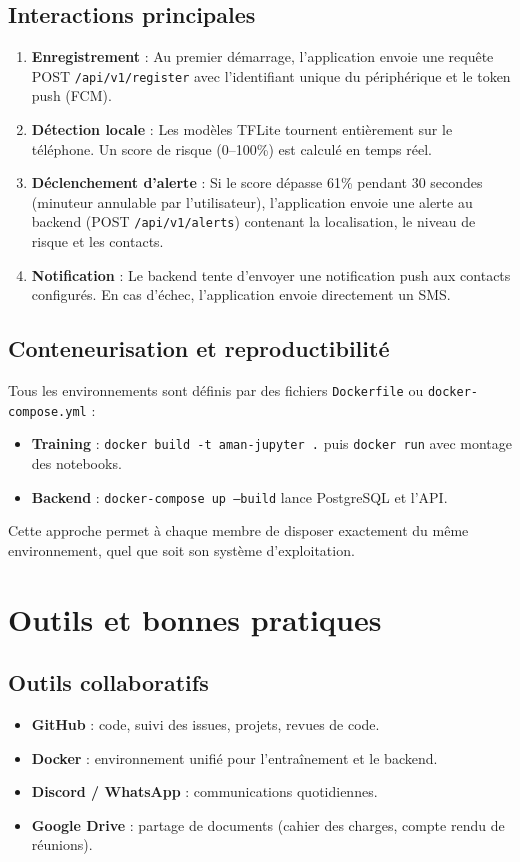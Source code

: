 \documentclass[11pt,a4paper]{article}
\begin{document}
\subsection{Interactions principales}
\begin{enumerate}
    \item \textbf{Enregistrement} : Au premier démarrage, l’application envoie une requête POST \texttt{/api/v1/register} avec l’identifiant unique du périphérique et le token push (FCM).
    \item \textbf{Détection locale} : Les modèles TFLite tournent entièrement sur le téléphone. Un score de risque (0–100\%) est calculé en temps réel.
    \item \textbf{Déclenchement d’alerte} : Si le score dépasse 61\% pendant 30 secondes (minuteur annulable par l’utilisateur), l’application envoie une alerte au backend (POST \texttt{/api/v1/alerts}) contenant la localisation, le niveau de risque et les contacts.
    \item \textbf{Notification} : Le backend tente d’envoyer une notification push aux contacts configurés. En cas d’échec, l’application envoie directement un SMS.
\end{enumerate}

\subsection{Conteneurisation et reproductibilité}
Tous les environnements sont définis par des fichiers \texttt{Dockerfile} ou \texttt{docker-compose.yml} :
\begin{itemize}
    \item \textbf{Training} : \texttt{docker build -t aman-jupyter .} puis \texttt{docker run} avec montage des notebooks.
    \item \textbf{Backend} : \texttt{docker-compose up --build} lance PostgreSQL et l’API.
\end{itemize}
Cette approche permet à chaque membre de disposer exactement du même environnement, quel que soit son système d’exploitation.

\section{Outils et bonnes pratiques}
\subsection{Outils collaboratifs}
\begin{itemize}
    \item \textbf{GitHub} : code, suivi des issues, projets, revues de code.
    \item \textbf{Docker} : environnement unifié pour l’entraînement et le backend.
    \item \textbf{Discord / WhatsApp} : communications quotidiennes.
    \item \textbf{Google Drive} : partage de documents (cahier des charges, compte rendu de réunions).
\end{itemize}
\end{document}
